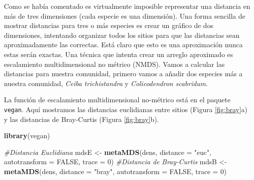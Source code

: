 \documentclass[]{book}
\newenvironment{Shaded}{\begin{snugshade}}{\end{snugshade}}
\newcommand{\KeywordTok}[1]{\textcolor[rgb]{0.13,0.29,0.53}{\textbf{{#1}}}}
\newcommand{\DataTypeTok}[1]{\textcolor[rgb]{0.13,0.29,0.53}{{#1}}}
\newcommand{\DecValTok}[1]{\textcolor[rgb]{0.00,0.00,0.81}{{#1}}}
\newcommand{\StringTok}[1]{\textcolor[rgb]{0.31,0.60,0.02}{{#1}}}
\newcommand{\CommentTok}[1]{\textcolor[rgb]{0.56,0.35,0.01}{\textit{{#1}}}}
\newcommand{\OtherTok}[1]{\textcolor[rgb]{0.56,0.35,0.01}{{#1}}}
\newcommand{\NormalTok}[1]{{#1}}
\begin{document}
Como se había comentado es virtualmente imposible representar una
distancia en más de tres dimensiones (cada especie es una dimensión).
Una forma sencilla de mostrar distancias para tres o más especies es
crear un gráfico de dos dimensiones, intentando organizar todos los
sitios para que las distancias sean aproximadamente las correctas. Está
claro que esto es una aproximación nunca estas serán exactas. Una
técnica que intenta crear un arreglo aproximado es escalamiento
multidimensional no métrico (NMDS). Vamos a calcular las distancias para
nuestra comunidad, primero vamos a añadir dos especies más a nuestra
comunidad, \emph{Ceiba trichistandra} y \emph{Colicodendron scabridum}.

\begin{Shaded}
\end{Shaded}

La función de escalamiento multidimensional no-métrico está en el
paquete \texttt{vegan}. Aquí mostramos las distancias euclidianas entre
sitios (Figura \ref{fig:bray}a) y las distancias de Bray-Curtis (Figura
\ref{fig:bray}b).

\begin{Shaded}
\begin{Highlighting}[]
\KeywordTok{library}\NormalTok{(vegan) }

\CommentTok{#Distancia Euclidiana}
\NormalTok{mdsE <-}\StringTok{ }\KeywordTok{metaMDS}\NormalTok{(dens, }\DataTypeTok{distance =} \StringTok{"euc"}\NormalTok{, }\DataTypeTok{autotransform =} \OtherTok{FALSE}\NormalTok{, }\DataTypeTok{trace =} \DecValTok{0}\NormalTok{) }
\CommentTok{#Distancia de Bray-Curtis}
\NormalTok{mdsB <-}\StringTok{ }\KeywordTok{metaMDS}\NormalTok{(dens, }\DataTypeTok{distance =} \StringTok{"bray"}\NormalTok{, }\DataTypeTok{autotransform =} \OtherTok{FALSE}\NormalTok{, }\DataTypeTok{trace =} \DecValTok{0}\NormalTok{) }
\end{Highlighting}
\end{Shaded}
\end{document}
